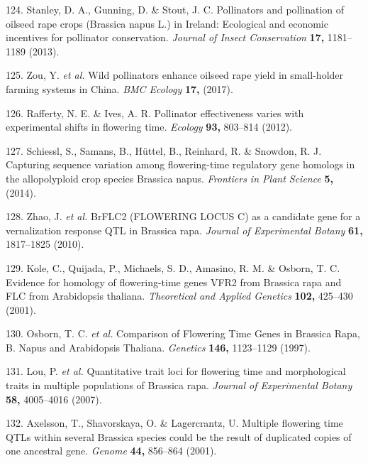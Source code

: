 \documentclass[12pt,]{book}
\begin{document}
\hypertarget{ref-stanley_pollinators_2013}{}
124. Stanley, D. A., Gunning, D. \& Stout, J. C. Pollinators and
pollination of oilseed rape crops (Brassica napus L.) in Ireland:
Ecological and economic incentives for pollinator conservation.
\emph{Journal of Insect Conservation} \textbf{17,} 1181--1189 (2013).

\hypertarget{ref-zou_wild_2017}{}
125. Zou, Y. \emph{et al.} Wild pollinators enhance oilseed rape yield
in small-holder farming systems in China. \emph{BMC Ecology}
\textbf{17,} (2017).

\hypertarget{ref-rafferty_pollinator_2012}{}
126. Rafferty, N. E. \& Ives, A. R. Pollinator effectiveness varies with
experimental shifts in flowering time. \emph{Ecology} \textbf{93,}
803--814 (2012).

\hypertarget{ref-schiessl_capturing_2014}{}
127. Schiessl, S., Samans, B., Hüttel, B., Reinhard, R. \& Snowdon, R.
J. Capturing sequence variation among flowering-time regulatory gene
homologs in the allopolyploid crop species Brassica napus.
\emph{Frontiers in Plant Science} \textbf{5,} (2014).

\hypertarget{ref-zhao_brflc2_2010}{}
128. Zhao, J. \emph{et al.} BrFLC2 (FLOWERING LOCUS C) as a candidate
gene for a vernalization response QTL in Brassica rapa. \emph{Journal of
Experimental Botany} \textbf{61,} 1817--1825 (2010).

\hypertarget{ref-kole_evidence_2001}{}
129. Kole, C., Quijada, P., Michaels, S. D., Amasino, R. M. \& Osborn,
T. C. Evidence for homology of flowering-time genes VFR2 from Brassica
rapa and FLC from Arabidopsis thaliana. \emph{Theoretical and Applied
Genetics} \textbf{102,} 425--430 (2001).

\hypertarget{ref-osborn_comparison_1997}{}
130. Osborn, T. C. \emph{et al.} Comparison of Flowering Time Genes in
Brassica Rapa, B. Napus and Arabidopsis Thaliana. \emph{Genetics}
\textbf{146,} 1123--1129 (1997).

\hypertarget{ref-lou_quantitative_2007}{}
131. Lou, P. \emph{et al.} Quantitative trait loci for flowering time
and morphological traits in multiple populations of Brassica rapa.
\emph{Journal of Experimental Botany} \textbf{58,} 4005--4016 (2007).

\hypertarget{ref-axelsson_multiple_2001}{}
132. Axelsson, T., Shavorskaya, O. \& Lagercrantz, U. Multiple flowering
time QTLs within several Brassica species could be the result of
duplicated copies of one ancestral gene. \emph{Genome} \textbf{44,}
856--864 (2001).
\end{document}
